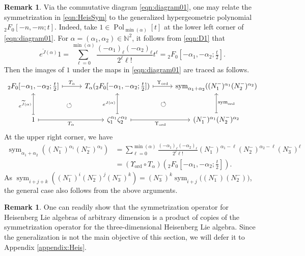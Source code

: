\documentclass[a4paper,11pt,reqno]{amsart}
\newcommand{\NN}{\mathbb{N}}
\newcommand{\0}{{\bf 0}}
\newcommand{\1}{{\bf 1}}
\DeclareMathOperator{\Pol}{Pol}
\newcommand{\ord}{{\mathrm{ord}}}
\newcommand{\wJ}{\widetilde{J}}
\DeclareMathOperator{\sym}{sym}
\theoremstyle{plain}
\theoremstyle{definition}
\newtheorem{remark}[equation]{Remark}
\numberwithin{equation}{section}
\theoremstyle{definition}
\begin{document}
\begin{remark}\label{rem:Heis_2F0}
Via the commutative diagram \eqref{eqn:diagram01}, one may relate
the symmetrization in \eqref{eqn:HeisSym}
to the generalized hypergeometric polynomial ${}_2F_0[-n, -m;t]$.
Indeed, take $1 \in \Pol_{\min(\alpha)}[t]$ at the lower left corner of \eqref{eqn:diagram01}.
For $\alpha=(\alpha_1,\alpha_2) \in \NN^2$, 
it follows from \eqref{eqn:D1} that 
\begin{equation}\label{eqn:eJ1}
e^{\wJ(\alpha)} 1 
= \sum_{\ell=0}^{\min(\alpha)}\frac{(-\alpha_1)_\ell(-\alpha_2)_\ell}{2^\ell \ell!}t^\ell
= {}_2F_0[-\alpha_1, -\alpha_2;\tfrac{t}{2}].
\end{equation}
Then the images of $1$ under the maps in \eqref{eqn:diagram01} are traced as 
follows.
\begin{equation*}
\begin{tikzcd}[row sep=1cm, column sep=1cm]
{}_2F_0[-\alpha_1, -\alpha_2;\tfrac{t}{2}]
\arrow[r, "T_\alpha", mapsto]
& 
T_\alpha({}_2F_0[-\alpha_1, -\alpha_2;\tfrac{t}{2}])
\arrow[dl, pos=0.5, phantom, "\circlearrowleft"]
\arrow[r, "\Upsilon_{\ord}", mapsto]
& 
\sym_{\alpha_1+\alpha_2}((N_1^-)^{\alpha_1}(N_2^-)^{\alpha_2})
\arrow[dl, pos=0.5, phantom, "\circlearrowleft"]
\\
1
\arrow[u, "e^{\wJ(\alpha)}", mapsto]
\arrow[r, "T_\alpha"', mapsto]
& 
\zeta_1^{\alpha_1}\zeta_2^{\alpha_2}
\arrow[u, "e^{J(\alpha)}",mapsto]
\arrow[r, "\Upsilon_{\ord}"', mapsto]
& (N_1^-)^{\alpha_1}(N_2^-)^{\alpha_2}
\arrow[u,  "\sym_{\ord}"', mapsto]
\end{tikzcd}
\end{equation*}
At the upper right corner, we have
\begin{align*}
\sym_{\alpha_1+\alpha_2}((N_1^-)^{\alpha_1}(N_2^-)^{\alpha_2})
&= \sum_{\ell=0}^{\min(\alpha)}\frac{(-\alpha_1)_\ell(-\alpha_2)_\ell}{2^\ell \ell!}
(N_1^-)^{\alpha_1-\ell}(N_2^-)^{\alpha_2-\ell}(N_3^-)^\ell\\[3pt]
&=(\Upsilon_{\ord}\circ T_\alpha)({}_2F_0[-\alpha_1, -\alpha_2;\tfrac{t}{2}]).
\end{align*}
As $\sym_{i+j+k}((N_1^-)^i(N_2^-)^j(N_3^-)^k) 
= (N_3^-)^k\sym_{i+j}\big((N_1^-)(N_2^-)\big)$, the general case also follows from the 
above arguments.
\end{remark}

\begin{remark}
One can readily show that the symmetrization operator for
Heisenberg Lie algebras of arbitrary dimension is 
a product of copies of the symmetrization operator for 
the three-dimensional Heisenberg Lie algebra. 
Since the generalization is not the main objective of this section, we will defer it to Appendix \ref{appendix:Heis}.
\end{remark}
\end{document}
